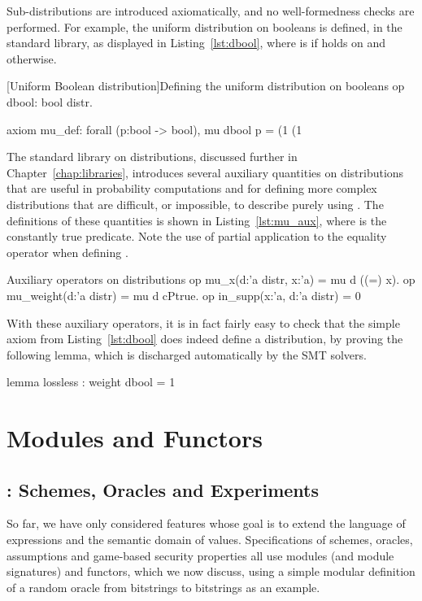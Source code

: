 Sub-distributions are introduced axiomatically, and no well-formedness checks
are performed. For example, the uniform distribution on booleans is defined, in
the standard library, as displayed in Listing~\ref{lst:dbool}, where
 is  if  holds on  and
 otherwise.

\begin{easycrypt}[label={lst:dbool}]{[Uniform Boolean distribution]Defining the uniform distribution on booleans}
op dbool: bool distr.

axiom mu_def: forall (p:bool -> bool), 
  mu dbool p =
    (1%
    (1%
\end{easycrypt}

The standard library on distributions, discussed further in
Chapter~\ref{chap:libraries}, introduces several auxiliary quantities on
distributions that are useful in probability computations and for defining more
complex distributions that are difficult, or impossible, to describe purely
using . The definitions of these quantities is shown in
Listing~\ref{lst:mu_aux}, where  is the constantly true predicate.
Note the use of partial application to the equality operator when defining
.

\begin{easycrypt}[label={lst:mu_aux}]{Auxiliary operators on distributions}
op mu_x(d:'a distr, x:'a) = mu d ((=) x).
op mu_weight(d:'a distr) = mu d cPtrue.
op in_supp(x:'a, d:'a distr) = 0%
\end{easycrypt}

With these auxiliary operators, it is in fact fairly easy to check that the simple axiom from Listing~\ref{lst:dbool} does indeed define a distribution, by proving the following lemma, which is discharged automatically by the SMT solvers.

\begin{easycrypt}[]{}
lemma lossless : weight dbool = 1%
\end{easycrypt}

\section{Modules and Functors\label{sec:modules}}

\subsection{\pWHILE: Schemes, Oracles and Experiments}
So far, we have only considered features whose goal is to extend the language of
expressions and the semantic domain of values. Specifications of schemes,
oracles, assumptions and game-based security properties all use modules (and
module signatures) and functors, which we now discuss, using a simple modular
definition of a random oracle from bitstrings to bitstrings as an example.


